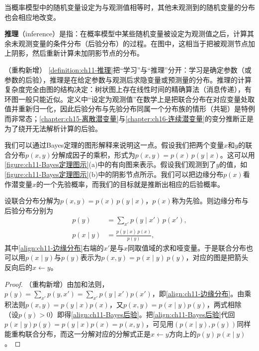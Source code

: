 \documentclass[../../main.tex]{subfiles}
\begin{document}
当概率模型中的随机变量设定为与观测值相等时，其他未观测到的随机变量的分布也会相应地改变。

\begin{definition}[推理]\label{definition:ch11-推理}
\textbf{推理}（inference）是指：在概率模型中某些随机变量被设定为观测值之后，计算其余未观测变量的条件分布（后验分布）的过程。在图中，这相当于把被观测节点加上阴影，然后重新计算未加阴影节点的分布。
\end{definition}

\begin{remark}（重构新增）
\cref{definition:ch11-推理}把“学习”与“推理”分开：学习是确定参数（或参数的后验），推理是在给定参数与观测后求隐变量或预测量的分布。推理的计算复杂度完全由图的结构决定：树状图上存在线性时间的精确算法（消息传递），有环图一般只能近似。定义中“设定为观测值”在数学上是把联合分布在对应变量处取值并重新归一化，因此后验分布与先验分布同属一个分布族的情形（共轭）是特例而非常态；\cref{chapter:ch15-离散潜变量}与\cref{chapter:ch16-连续潜变量}的变分推断正是为了绕开无法解析计算的后验。
\end{remark}

我们可以通过Bayes定理的图形解释来说明这一点。假设我们把两个变量$x$和$y$的联合分布$p(x,y)$分解成因子的乘积，形式为$p(x,y)=p(x)\,p(y\mid x)$。这可以用\cref{figure:ch11-Bayes定理图示}(a)中的有向图来表示。假设我们观测到了$y$的值，如\cref{figure:ch11-Bayes定理图示}(b)中的阴影节点所示。我们可以把边缘分布$p(x)$看作潜变量$x$的一个先验概率，而我们的目标就是推断出相应的后验概率。

\begin{proposition}[两个变量的Bayes更新]\label{proposition:ch11-Bayes更新}
设联合分布分解为$p(x,y)=p(x)\,p(y\mid x)$，$p(x)$称为先验。则边缘分布与后验分布分别为
\begin{align}
  p(y) &= \sum_{x'}p(y\mid x')\,p(x'),
  \label{align:ch11-边缘分布}\\
  p(x\mid y) &= \frac{p(y\mid x)\,p(x)}{p(y)},
  \label{align:ch11-Bayes后验}
\end{align}
其中\eqref{align:ch11-边缘分布}右端的$x'$是与$x$同取值域的求和哑变量。于是联合分布也可以用$p(x\mid y)$与$p(y)$表示为$p(x,y)=p(x\mid y)\,p(y)$，对应的图是把箭头反向后的$x\leftarrow y$。
\end{proposition}

\begin{proof}
（重构新增）由加和法则，$p(y)=\sum_{x'}p(y,x')=\sum_{x'}p(y\mid x')p(x')$，即\eqref{align:ch11-边缘分布}。由乘积法则$p(x,y)=p(y\mid x)p(x)$，又$p(x,y)=p(x\mid y)p(y)$，两式相除（设$p(y)>0$）即得\eqref{align:ch11-Bayes后验}。把\eqref{align:ch11-Bayes后验}代回$p(x\mid y)p(y)=p(y\mid x)p(x)=p(x,y)$，可见用$(p(x\mid y),p(y))$同样能重构联合分布，而这一分解对应的分解式正是$x\leftarrow y$方向上的$p(y)\,p(x\mid y)$。
\end{proof}
\end{document}
